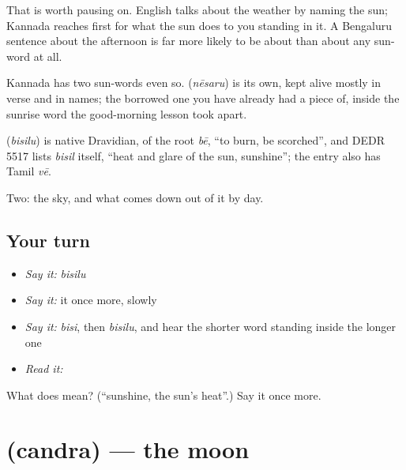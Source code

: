 That is worth pausing on. English talks about the weather by naming the sun; Kannada reaches first for what the sun does to you standing in it. A Bengaluru sentence about the afternoon is far more likely to be about  than about any sun-word at all.

Kannada has two sun-words even so.  (\emph{nēsaru}) is its own, kept alive mostly in verse and in names; the borrowed one you have already had a piece of, inside the sunrise word the good-morning lesson took apart.

\begin{cousinweb}
\textbf{} (\emph{bisilu}) is native Dravidian, of the root \emph{bē}, \textquotedblleft{}to burn, be scorched\textquotedblright{}, and DEDR 5517 lists \emph{bisil} itself, \textquotedblleft{}heat and glare of the sun, sunshine\textquotedblright{}; the entry also has Tamil \emph{vē}.
\end{cousinweb}

\begin{grammarlens}[title={What you've built}]
Two: the sky, and what comes down out of it by day.
\end{grammarlens}

\subsection*{Your turn}
\begin{itemize}
\raggedright
  \item \emph{Say it:} \emph{bisilu}
  \item \emph{Say it:} it once more, slowly
  \item \emph{Say it:} \emph{bisi}, then \emph{bisilu}, and hear the shorter word standing inside the longer one
  \item \emph{Read it:} \textbf{}
\end{itemize}

\begin{tcolorbox}[breakable,colback=teal!4,colframe=teal!35!black,title={Before you move on}]
What does  mean? (\textquotedblleft{}sunshine, the sun's heat\textquotedblright{}.) Say it once more.
\end{tcolorbox}
\section[\texorpdfstring{\kn{ಚಂದ್ರ} (candra)}{ಚಂದ್ರ (candra)}]{ (candra) — the moon}

